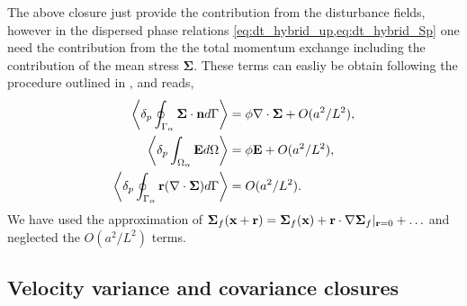 The above closure just provide the contribution from the disturbance fields, however in the dispersed phase relations \eqref{eq:dt_hybrid_up,eq:dt_hybrid_Sp} one need the contribution from the the total momentum exchange including the contribution of the mean stress $\bm\Sigma$. 
These terms can easliy be obtain following the procedure outlined in \citep{zhang1997momentum,morel2015mathematical}, and reads, 
\begin{align}
    \pSavg{\bm\Sigma\cdot \textbf{n}}
    &= \phi\div\bm\Sigma + O(a^2/L^2),\\
    \pOavg{\textbf{E}}
    &= \phi \textbf{E}+ O(a^2/L^2),\\
    \pSavg{\textbf{r}(\div \bm\Sigma)}
    &= O(a^2/L^2). 
    \label{eq:mean_contributions}
\end{align}
We have used the approximation of $\bm\Sigma_f(\textbf{x}+\textbf{r}) = \bm\Sigma_f(\textbf{x}) + \textbf{r}\cdot\mathbf{\nabla} \bm\Sigma_f|_{\textbf{r}=0} + \ldots$ and neglected the $O(a^2/L^2)$ terms. 


\subsection{Velocity variance and covariance closures}


